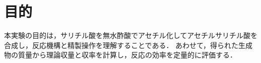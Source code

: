 \section{目的}
本実験の目的は，サリチル酸を無水酢酸でアセチル化してアセチルサリチル酸を合成し，反応機構と精製操作を理解することである．
あわせて，得られた生成物の質量から理論収量と収率を計算し，反応の効率を定量的に評価する．